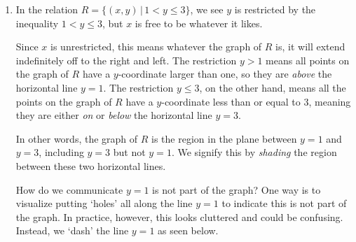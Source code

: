 \documentclass{ximera}
\begin{document}
\begin{example}
\begin{explanation}
\begin{enumerate}
\begin{enumerate}
   \begin{image}
\end{image}

\item  In the relation $R = \{ (x,y) \, | \, 1 < y \leq 3 \}$, we see $y$ is restricted by the inequality $1 < y \leq 3$, but  $x$ is free to be whatever it likes.   

Since $x$ is unrestricted, this means whatever the graph of $R$ is, it will extend indefinitely off to the right and left.  The restriction $y > 1$ means all points on the graph of $R$ have a $y$-coordinate larger than one, so they are \textit{above} the horizontal line $y =1$.  The restriction $y \leq 3$, on the other hand,  means all the points on the graph of $R$ have a $y$-coordinate less than or equal to $3$, meaning they are either \textit{on} or \textit{below} the horizontal line $y = 3$.   

In other words, the graph of $R$ is the region in the plane between $y=1$ and $y=3$, including $y=3$ but not $y = 1$.  We signify this by \textit{shading} the region between these two horizontal lines.  

How do we communicate $y=1$ is not part of the graph?  One way is to visualize putting `holes' all along the line $y=1$ to indicate this is not part of the graph.  In practice, however, this looks cluttered and could be confusing.  Instead, we  `dash' the line $y = 1$ as seen below. 



\end{enumerate}
\end{enumerate}
\end{explanation}
\end{example}
\end{document}

